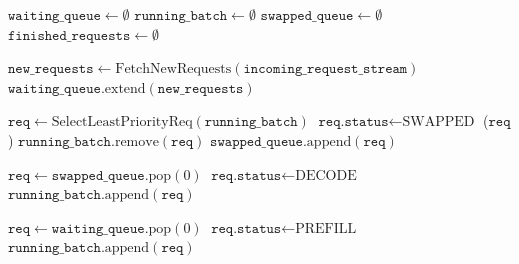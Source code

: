 \documentclass[11pt]{article}
\begin{document}
\begin{algorithm}[htbp]
\caption{Continuous Batching Inference (with Priority and Preemption)}
\label{alg:continuous_batching_vllm}
\begin{algorithmic}[1]
    \State $\texttt{waiting\_queue} \gets \emptyset$
    \State $\texttt{running\_batch} \gets \emptyset$
    \State $\texttt{swapped\_queue} \gets \emptyset$ 
    \State $\texttt{finished\_requests} \gets \emptyset$
    
        \State {}
        \State $\texttt{new\_requests} \gets \text{FetchNewRequests}(\texttt{incoming\_request\_stream})$
        \State $\texttt{waiting\_queue}.\text{extend}(\texttt{new\_requests})$

        \State {}
            \State $\texttt{req} \gets \text{SelectLeastPriorityReq}(\texttt{running\_batch})$
            \State $\texttt{req.status} \gets \text{SWAPPED}$
            \State {}($\texttt{req}$) 
            \State $\texttt{running\_batch}.\text{remove}(\texttt{req})$
            \State $\texttt{swapped\_queue}.\text{append}(\texttt{req})$
        \EndWhile
        
        \State {}
            \State $\texttt{req} \gets \texttt{swapped\_queue}.\text{pop}(0)$
            \State $\texttt{req.status} \gets \text{DECODE}$ 
            \State $\texttt{running\_batch}.\text{append}(\texttt{req})$
        \EndWhile
        
            \State $\texttt{req} \gets \texttt{waiting\_queue}.\text{pop}(0)$
            \State ${\texttt{req.status}} \gets \text{PREFILL}$
            \State $\texttt{running\_batch}.\text{append}(\texttt{req})$
        \EndWhile
        

\end{algorithmic}
\end{algorithm}
\end{document}
